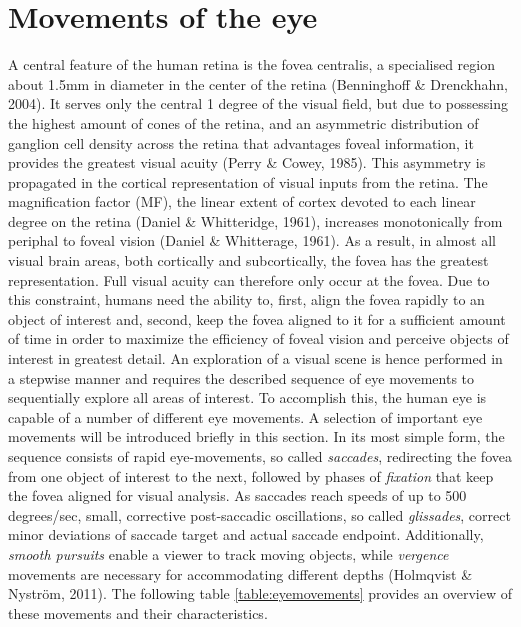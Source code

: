 \documentclass[a4paper, 11pt]{scrreprt}
\begin{document}
\section{Movements of the eye}
A central feature of the human retina is the fovea centralis, a specialised region about 1.5mm in diameter in the center of the retina (Benninghoff \& Drenckhahn, 2004). It serves only the central 1 degree of the visual field, but due to possessing the highest amount of cones of the retina, and an asymmetric distribution of ganglion cell density across the retina that advantages foveal information, it provides the greatest visual acuity (Perry \& Cowey, 1985). This asymmetry is propagated in the cortical representation of visual inputs from the retina. The magnification factor (MF), the linear extent of cortex devoted to each linear degree on the retina (Daniel \& Whitteridge, 1961), increases monotonically from periphal to foveal vision (Daniel \& Whitterage, 1961). As a result, in almost all visual brain areas, both cortically and subcortically, the fovea has the greatest representation. Full visual acuity can therefore only occur at the fovea. 
Due to this constraint, humans need the ability to, first, align the fovea rapidly to an object of interest and, second, keep the fovea aligned to it for a sufficient amount of time in order to maximize the efficiency of foveal vision and perceive objects of interest in greatest detail. An exploration of a visual scene is hence performed in a stepwise manner and requires the described sequence of eye movements to sequentially explore all areas of interest. To accomplish this, the human eye is capable of a number of different eye movements. A selection of important eye movements will be introduced briefly in this section. \newline
In its most simple form, the sequence consists of rapid eye-movements, so called \textit{saccades}, redirecting the fovea from one object of interest to the next, followed by phases of \textit{fixation} that keep the fovea aligned for visual analysis. As saccades reach speeds of up to 500 degrees/sec, small, corrective post-saccadic oscillations, so called \textit{glissades}, correct minor deviations of saccade target and actual saccade endpoint. Additionally, \textit{smooth pursuits} enable a viewer to track moving objects, while \textit{vergence} movements are necessary for accommodating different depths (Holmqvist \& Nyström, 2011). The following table \ref{table:eyemovements} provides an overview of these movements and their characteristics. 
  
\end{document}
